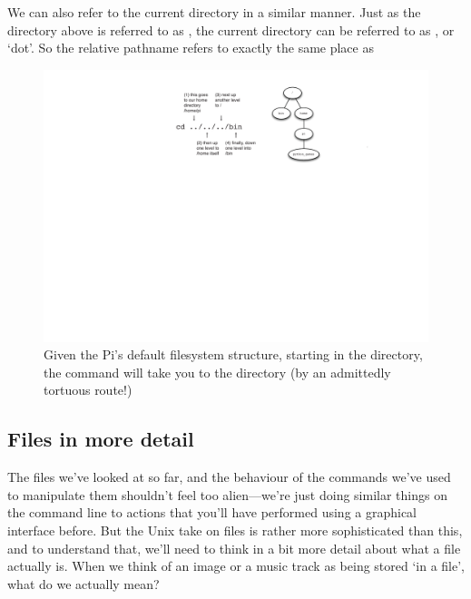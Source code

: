 We can also refer to the current directory in a similar manner. Just as the directory above is referred to as , the current directory can be referred to as , or `dot'. So the relative pathname  refers to exactly the same place as 


\begin{figure}[t]
\centerline{\includegraphics[width=13.5cm]{images/simple-navigation}}
\caption{Given the Pi's default filesystem structure, starting in the  directory, the command  will take you to the  directory (by an admittedly tortuous route!)}\label{figure:simple-navigation}
\end{figure}

\subsection{Files in more detail}

The files we've looked at so far, and the behaviour of the commands we've used to manipulate them shouldn't feel too alien---we're just doing similar things on the command line to actions that you'll have performed using a graphical interface before. But the Unix take on files is rather more sophisticated than this, and to understand that, we'll need to think in a bit more detail about what a file actually is. When we think of an image or a music track as being stored `in a file', what do we actually mean?

